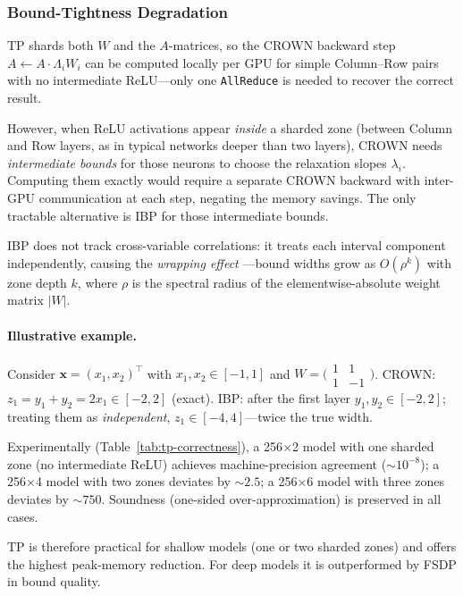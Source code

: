 \documentclass[11pt]{article}
\begin{document}
\subsubsection{Bound-Tightness Degradation}
\label{sec:tp-precision}

TP shards both $W$ and the $A$-matrices, so the CROWN backward step
$A \leftarrow A \cdot \Lambda_i W_i$ can be computed locally per GPU for
simple Column--Row pairs with no intermediate ReLU---only one
\texttt{AllReduce} is needed to recover the correct result.

However, when ReLU activations appear \emph{inside} a sharded zone (between
Column and Row layers, as in typical networks deeper than two layers), CROWN
needs \emph{intermediate bounds} for those neurons to choose the relaxation
slopes $\lambda_i$. Computing them exactly would require a separate CROWN
backward with inter-GPU communication at each step, negating the memory savings.
The only tractable alternative is IBP for those intermediate bounds.

IBP does not track cross-variable correlations: it treats each interval
component independently, causing the \emph{wrapping effect}
\citep{moore2009interval}---bound widths grow as $O(\rho^k)$ with zone depth
$k$, where $\rho$ is the spectral radius of the elementwise-absolute weight
matrix $|W|$.

\paragraph{Illustrative example.}
Consider $\mathbf{x} = (x_1, x_2)^\top$ with $x_1, x_2 \in [-1,1]$ and
$W = \bigl(\begin{smallmatrix}1&1\\1&-1\end{smallmatrix}\bigr)$.
CROWN: $z_1 = y_1 + y_2 = 2x_1 \in [-2, 2]$ (exact).
IBP: after the first layer $y_1, y_2 \in [-2, 2]$; treating them as
\emph{independent}, $z_1 \in [-4, 4]$---twice the true width.

Experimentally (Table~\ref{tab:tp-correctness}), a 256$\times$2 model with one
sharded zone (no intermediate ReLU) achieves machine-precision agreement
(${\sim}10^{-8}$); a 256$\times$4 model with two zones deviates by ${\sim}2.5$;
a 256$\times$6 model with three zones deviates by ${\sim}750$.
Soundness (one-sided over-approximation) is preserved in all cases.

TP is therefore practical for shallow models (one or two sharded zones) and
offers the highest peak-memory reduction. For deep models it is outperformed
by FSDP in bound quality.
\end{document}
